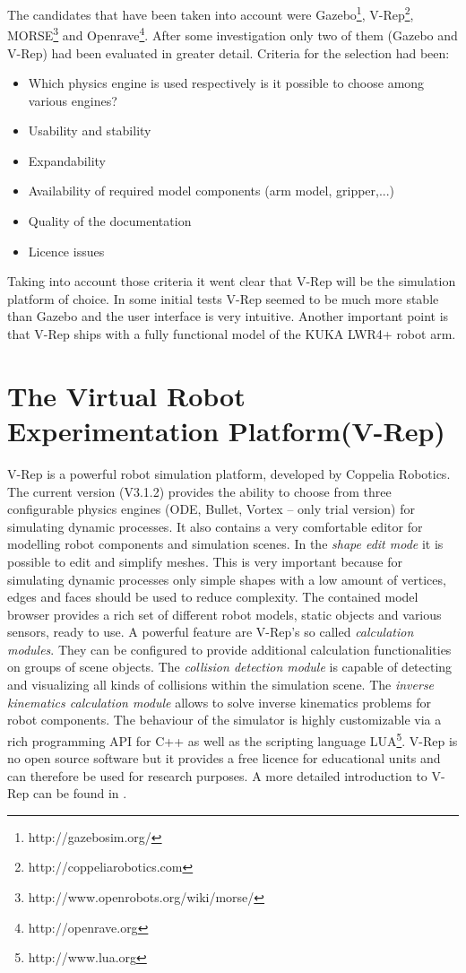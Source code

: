 The candidates that have been taken into account were Gazebo\footnote{http://gazebosim.org/}, V-Rep\footnote{http://coppeliarobotics.com}, MORSE\footnote{http://www.openrobots.org/wiki/morse/} and Openrave\footnote{http://openrave.org}. After some investigation only two of them (Gazebo and V-Rep) had been evaluated in greater detail. Criteria for the selection had been:

\begin{itemize}
\item
Which physics engine is used respectively is it possible to choose among various engines?
\item
Usability and stability
\item
Expandability
\item
Availability of required model components (arm model, gripper,...)
\item
Quality of the documentation
\item
Licence issues
\end{itemize}

Taking into account those criteria it went clear that V-Rep will be the simulation platform of choice. In some initial tests V-Rep seemed to be much more stable than Gazebo and the user interface is very intuitive. Another important point is that V-Rep ships with a fully functional model of the KUKA LWR4+ robot arm.

\section{The Virtual Robot Experimentation Platform(V-Rep)}
V-Rep is a powerful robot simulation platform, developed by Coppelia Robotics. The current version (V3.1.2) provides the ability to choose from three configurable physics engines (ODE, Bullet, Vortex -- only trial version) for simulating dynamic processes. It also contains a very comfortable editor for modelling robot components and simulation scenes. In the \emph{shape edit mode} it is possible to edit and simplify meshes. This is very important because for simulating dynamic processes only simple shapes with a low amount of vertices, edges and faces should be used to reduce complexity. The contained model browser provides a rich set of different robot models, static objects and various sensors, ready to use. A powerful feature are V-Rep's so called \emph{calculation modules}. They can be configured to provide additional calculation functionalities on groups of scene objects. The \emph{collision detection module} is capable of detecting and visualizing all kinds of collisions within the simulation scene. The \emph{inverse kinematics calculation module} allows to solve inverse kinematics problems for robot components. The behaviour of the simulator is highly customizable via a rich programming API for C++ as well as the scripting language LUA\footnote{http://www.lua.org}. V-Rep is no open source software but it provides a free licence for educational units and can therefore be used for research purposes. A more detailed introduction to V-Rep can be found in \cite{freese2013}.

